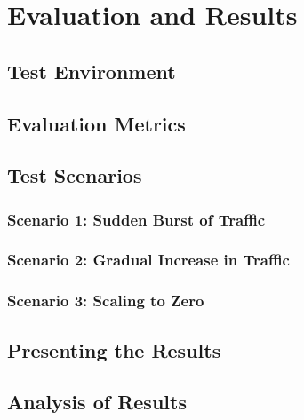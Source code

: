 \chapter{Evaluation and Results}
\label{cha:evaluation}

\section{Test Environment}

\section{Evaluation Metrics}

\section{Test Scenarios}
\subsection{Scenario 1: Sudden Burst of Traffic}
\subsection{Scenario 2: Gradual Increase in Traffic}
\subsection{Scenario 3: Scaling to Zero}

\section{Presenting the Results}

\section{Analysis of Results}
